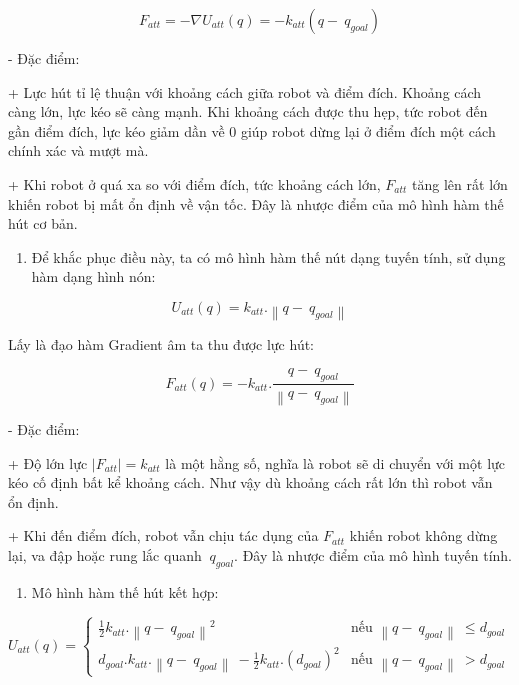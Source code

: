 \documentclass[12pt,a4paper,oneside]{report}
\begin{document}
\[F_{att} = - \nabla U_{att}(q) = - k_{att}(q - {\ q}_{goal})\]

- Đặc điểm:

+ Lực hút tỉ lệ thuận với khoảng cách giữa robot và điểm đích. Khoảng cách càng lớn, lực kéo sẽ càng mạnh. Khi khoảng cách được thu hẹp, tức robot đến gần điểm đích, lực kéo giảm dần về 0 giúp robot dừng lại ở điểm đích một cách chính xác và mượt mà.

+ Khi robot ở quá xa so với điểm đích, tức khoảng cách lớn, \(F_{att}\) tăng lên rất lớn khiến robot bị mất ổn định về vận tốc. Đây là nhược điểm của mô hình hàm thế hút cơ bản.

\begin{enumerate}
\def\labelenumi{\arabic{enumi}.}
\setcounter{enumi}{1}
\item
  Để khắc phục điều này, ta có mô hình hàm thế nút dạng tuyến tính, sử dụng hàm dạng hình nón:
\end{enumerate}

\[U_{att}(q) = k_{att}.\left\| q - {\ q}_{goal} \right\|\]

Lấy là đạo hàm Gradient âm ta thu được lực hút:

\[F_{att}(q) = - k_{att}.\frac{q - {\ q}_{goal}}{\left\| q - {\ q}_{goal} \right\|}\]

- Đặc điểm:

+ Độ lớn lực \(\left| F_{att} \right| = k_{att}\) là một hằng số, nghĩa là robot sẽ di chuyển với một lực kéo cố định bất kể khoảng cách. Như vậy dù khoảng cách rất lớn thì robot vẫn ổn định.

+ Khi đến điểm đích, robot vẫn chịu tác dụng của \(F_{att}\) khiến robot không dừng lại, va đập hoặc rung lắc quanh \({\ q}_{goal}\). Đây là nhược điểm của mô hình tuyến tính.

\begin{enumerate}
\def\labelenumi{\arabic{enumi}.}
\setcounter{enumi}{2}
\item
  Mô hình hàm thế hút kết hợp:
\end{enumerate}

\[U_{att}(q) = \begin{cases}
\frac{1}{2}k_{att}.\left\| q - {\ q}_{goal} \right\|^{2} & \text{nếu } \left\| q - {\ q}_{goal} \right\|\  \leq d_{goal}\  \\
d_{goal}.k_{att}.\left\| q - {\ q}_{goal} \right\|\  - \frac{1}{2}k_{att}.{(d_{goal})}^{2} & \text{nếu } \left\| q - {\ q}_{goal} \right\|\  > d_{goal}\ 
\end{cases}\ \]
\end{document}
